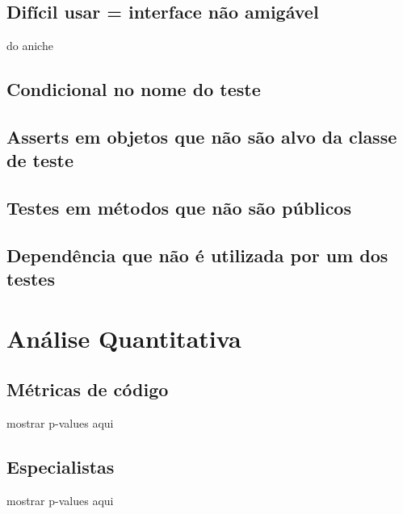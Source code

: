 \subsection{Difícil usar = interface não amigável}


do aniche

\subsection{Condicional no nome do teste}

\subsection{Asserts em objetos que não são alvo da classe de teste}

\subsection{Testes em métodos que não são públicos}

\subsection{Dependência que não é utilizada por um dos testes}

\section{Análise Quantitativa}

\subsection{Métricas de código}

mostrar p-values aqui

\subsection{Especialistas}

mostrar p-values aqui

